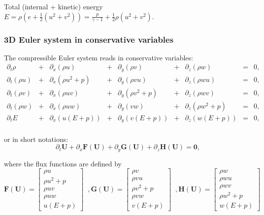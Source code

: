 \documentclass{article}
\begin{document}
Total (internal + kinetic) energy $E = \rho \left( e + \frac{1}{2} (u^2+v^2) \right) = \frac{p}{\gamma-1} + \frac{1}{2} \rho (u^2+v^2)$.

\subsubsection*{3D Euler system in conservative variables}
The compressible Euler system reads in conservative variables:\\
\begin{equation}
  \begin{array}{ccccccccc}
    \partial_t \rho & + & \partial_x(\rho u) & + & \partial_y(\rho v) & + & \partial_z(\rho w) & = & 0,\\
    \partial_t (\rho u) & + & \partial_x(\rho u^2+p) & + & \partial_y(\rho v u) & + & \partial_z(\rho w u) & = & 0,\\
    \partial_t (\rho v) & + & \partial_x(\rho u v) & + & \partial_y(\rho v^2+p) & + & \partial_z(\rho w v) & = & 0,\\
    \partial_t (\rho w) & + & \partial_x(\rho u w) & + & \partial_y(v w) & + & \partial_z(\rho w^2+p) & = & 0,\\
    \partial_t E & + & \partial_x (u(E+p)) & + & \partial_y (v(E+p)) & + & \partial_z (w(E+p)) & = & 0,\\
  \end{array}
\end{equation}

or in short notations:
\begin{equation*}
  \partial_t \mathbf{U} + \partial_x \mathbf{F(U)} + \partial_y \mathbf{G(U)} + \partial_z \mathbf{H(U)} = \mathbf{0},
\end{equation*}

where the flux functions are defined by
\begin{equation}
  \mathbf{F(U)} = \left [
  \begin{array}{c}
    \rho u \\
    \rho u^2 + p \\
    \rho u v \\
    \rho u w \\
    u (E + p)
  \end{array} \right]
  \;\; ,
  \mathbf{G(U)} = \left [
  \begin{array}{c}
    \rho v \\
    \rho v u \\
    \rho v^2 + p \\
    \rho v w \\
    v (E + p)
  \end{array} \right]
  \;\; ,
  \mathbf{H(U)} = \left [
  \begin{array}{c}
    \rho w \\
    \rho w u \\
    \rho w v \\
    \rho w^2 + p \\
    w (E + p)
  \end{array} \right]
\end{equation}
\end{document}
